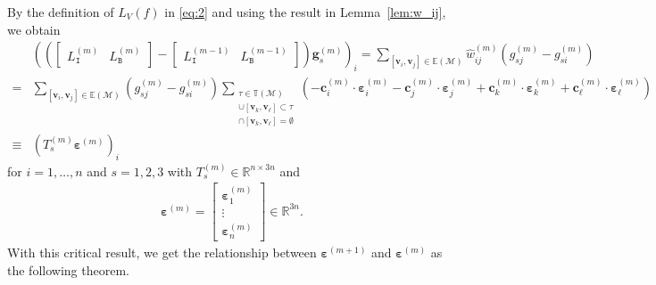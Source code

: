\documentclass[onefignum,onetabnum]{siamonline220329}
\numberwithin{equation}{section}
\def\c{\mathbf{c}}
\def\bv{\mathbf{v}}
\def\M{\mathcal{M}}
\def\I{\mathtt{I}}
\def\B{\mathtt{B}}
\def\beps{{\boldsymbol{\varepsilon}}}
\begin{document}
\begin{sloppypar}
By the definition of $L_V(f)$ in \eqref{eq:2} and using the result in Lemma~\ref{lem:w_ij}, we obtain
{\small\begin{align}
& \left( \left( \begin{bmatrix} 
L_{\I}^{(m)} & L_{\B}^{(m)} 
\end{bmatrix} - \begin{bmatrix} 
L_{\I}^{(m-1)} & L_{\B}^{(m-1)} 
\end{bmatrix} \right) \mathbf{g}^{(m)}_s \right)_i  
= \sum_{[\bv_i,\bv_j] \in \mathbb{E}(\M) } \widehat{w}_{ij}^{(m)} (g_{sj}^{(m)} - g_{si}^{(m)}) \nonumber \\ 
=& \sum_{[\bv_i,\bv_j] \in \mathbb{E}(\M) } (g_{sj}^{(m)} - g_{si}^{(m)}) \sum_{\substack{\tau\in\mathbb{T}(\mathcal{M})\\ [\bv_i,\bv_j]\cup[\bv_k, \bv_{\ell}]\subset\tau\\ [\bv_i,\bv_j]\cap[\bv_k, \bv_{\ell}]=\emptyset}} \left(-\c_i^{(m)}\cdot \beps_i^{(m)}-\c_j^{(m)} \cdot \beps_j^{(m)}+\c_k^{(m)} \cdot \beps_k^{(m)}+\c_{\ell}^{(m)} \cdot \beps_{\ell}^{(m)}\right)  \nonumber \\
\equiv & \left( T_s^{(m)} \beps^{(m)} 
\right)_i \label{eq:w_ij_gs}
\end{align}}
for $i = 1, \ldots, n$ and $s = 1, 2 ,3$ with $T_s^{(m)} \in \mathbb{R}^{n \times 3n}$ and 
\begin{align}
\beps^{(m)} =  \begin{bmatrix}
 \beps^{(m)}_1 \\ \vdots \\ \beps^{(m)}_n
\end{bmatrix} \in \mathbb{R}^{3n}. \label{eq:beps_m}
\end{align}
With this critical result, we get the relationship between $\beps^{(m+1)}$ and $\beps^{(m)}$ as the following theorem.


\end{sloppypar}
\end{document}

